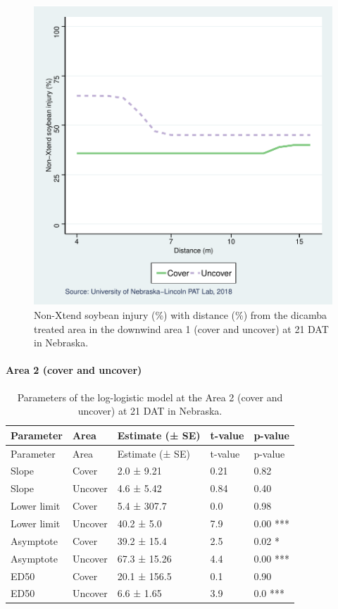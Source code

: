 \documentclass[]{article}
\let\oldparagraph\paragraph
\renewcommand{\paragraph}[1]{\oldparagraph{#1}\mbox{}}
\begin{document}
\begin{figure}
\centering
\includegraphics{Report_files/figure-latex/unnamed-chunk-73-1.pdf}
\caption{Non-Xtend soybean injury (\%) with distance (\%) from the
dicamba treated area in the downwind area 1 (cover and uncover) at 21
DAT in Nebraska.}
\end{figure}

\newpage

\paragraph{Area 2 (cover and uncover)}\label{area-2-cover-and-uncover}

\begin{longtable}[]{@{}lllll@{}}
\caption{Parameters of the log-logistic model at the Area 2 (cover and
uncover) at 21 DAT in Nebraska.}\tabularnewline
\toprule
Parameter & Area & Estimate (± SE) & t-value & p-value\tabularnewline
\midrule
\endfirsthead
\toprule
Parameter & Area & Estimate (± SE) & t-value & p-value\tabularnewline
\midrule
\endhead
Slope & Cover & 2.0 ± 9.21 & 0.21 & 0.82\tabularnewline
Slope & Uncover & 4.6 ± 5.42 & 0.84 & 0.40\tabularnewline
Lower limit & Cover & 5.4 ± 307.7 & 0.0 & 0.98\tabularnewline
Lower limit & Uncover & 40.2 ± 5.0 & 7.9 & 0.00 ***\tabularnewline
Asymptote & Cover & 39.2 ± 15.4 & 2.5 & 0.02 *\tabularnewline
Asymptote & Uncover & 67.3 ± 15.26 & 4.4 & 0.00 ***\tabularnewline
ED50 & Cover & 20.1 ± 156.5 & 0.1 & 0.90\tabularnewline
ED50 & Uncover & 6.6 ± 1.65 & 3.9 & 0.0 ***\tabularnewline
\bottomrule
\end{longtable}
\end{document}
